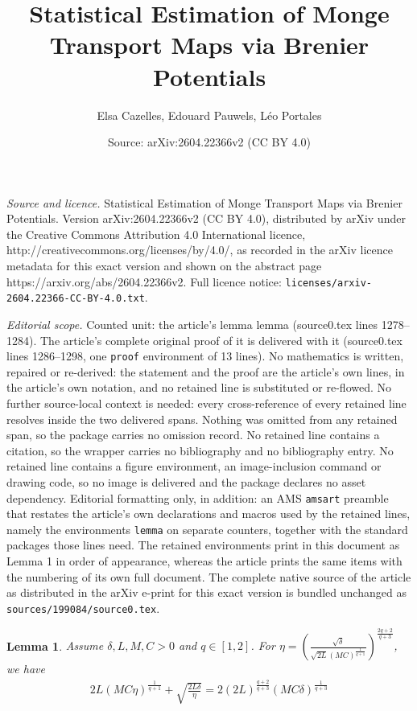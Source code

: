\documentclass[10pt,a4paper]{amsart}
\title{Statistical Estimation of Monge Transport Maps via Brenier Potentials}
\author{Elsa Cazelles, Edouard Pauwels, L\'eo Portales}
\date{Source: arXiv:2604.22366v2 (CC BY 4.0)}
\newtheorem{lemma}{Lemma}
\begin{document}
\maketitle

\noindent\emph{Source and licence.} Statistical Estimation of Monge Transport Maps via Brenier Potentials. Version arXiv:2604.22366v2 (CC BY 4.0), distributed by arXiv under the Creative Commons Attribution 4.0 International licence, http://creativecommons.org/licenses/by/4.0/, as recorded in the arXiv licence metadata for this exact version and shown on the abstract page https://arxiv.org/abs/2604.22366v2. Full licence notice: \texttt{licenses/arxiv-2604.22366-CC-BY-4.0.txt}.\par\smallskip

\noindent\textit{Editorial scope.} Counted unit: the article's lemma lemma (source0.tex lines 1278--1284). The article's complete original proof of it is delivered with it (source0.tex lines 1286--1298, one \texttt{proof} environment of 13 lines). No mathematics is written, repaired or re-derived: the statement and the proof are the article's own lines, in the article's own notation, and no retained line is substituted or re-flowed.  No further source-local context is needed: every cross-reference of every retained line resolves inside the two delivered spans.  Nothing was omitted from any retained span, so the package carries no omission record.  No retained line contains a citation, so the wrapper carries no bibliography and no bibliography entry.  No retained line contains a figure environment, an image-inclusion command or drawing code, so no image is delivered and the package declares no asset dependency.  Editorial formatting only, in addition: an AMS \texttt{amsart} preamble that restates the article's own declarations and macros used by the retained lines, namely the environments \texttt{lemma} on separate counters, together with the standard packages those lines need.  The retained environments print in this document as Lemma 1 in order of appearance, whereas the article prints the same items with the numbering of its own full document.  The complete native source of the article as distributed in the arXiv e-print for this exact version is bundled unchanged as \texttt{sources/199084/source0.tex}.
\begin{lemma}
    Assume $\delta,L,M,C > 0$ and $q \in [1,2]$.
	For $\eta = \left(\frac{\sqrt{\delta}}{\sqrt{2L} (M C)^{\frac{1}{q+1}}}\right)^{\frac{2q + 2}{q+3}}$, we have
	\begin{align*}
		2 L( M C\eta)^{\frac{1}{q+1}} + \sqrt{\frac{2L\delta}{\eta}} = 2 (2L)^{\frac{q+2}{q+3}} (MC\delta)^{\frac{1}{q+3}} 
	\end{align*}
\end{lemma}
\end{document}
